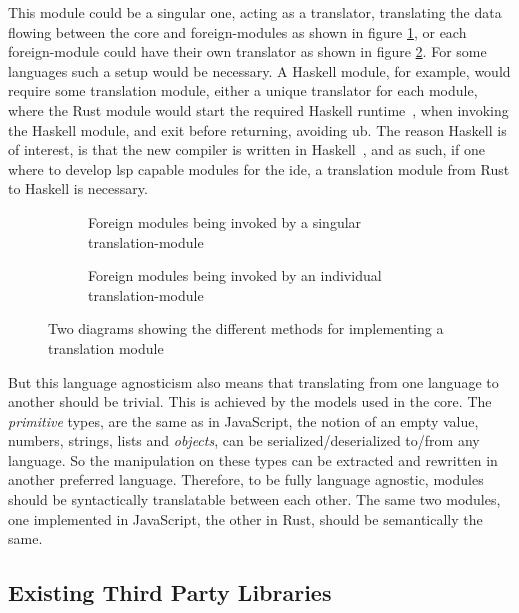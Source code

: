This module could be a singular one, acting as a translator, translating the
data flowing between the core and foreign-modules as shown in figure
\ref{fig:fm1}, or each foreign-module could have their own translator as shown
in figure \ref{fig:fm2}. For some languages such a setup would be necessary.
A Haskell module, for example, would require some translation module, either a
unique translator for each module, where the Rust module would start the
required Haskell runtime~\cite{ghcRts}, when invoking the Haskell module, and
exit before returning, avoiding \gls*{ub}. The reason Haskell is of interest,
is that the new compiler is written in Haskell~\cite{wiig}, and as such, if one
where to develop \gls*{lsp} capable modules for the \gls*{ide}, a translation
module from Rust to Haskell is necessary.

\begin{figure}[H]
  \begin{subfigure}[h]{0.49\linewidth}
    
    \caption{Foreign modules being invoked by a singular translation-module}
    \label{fig:fm1}
  \end{subfigure}
  \hfill
  \begin{subfigure}[h]{0.49\linewidth}
    
    \caption{Foreign modules being invoked by an individual translation-module}
    \label{fig:fm2}
  \end{subfigure}
  \caption{
    Two diagrams showing the different methods for implementing a translation
    module
  }
  \label{fig:fm}
\end{figure}

But this language agnosticism also means that translating from one language to
another should be trivial. This is achieved by the models used in the core. The
\textit{primitive} types, are the same as in JavaScript, the notion of an empty
value, numbers, strings, lists and \textit{objects}, can be
serialized/deserialized to/from any language. So the manipulation on these types
can be extracted and rewritten in another preferred language. Therefore, to be
fully language agnostic, modules should be syntactically translatable between
each other. The same two modules, one implemented in JavaScript, the other in
Rust, should be semantically the same.

\subsection{Existing Third Party Libraries}

